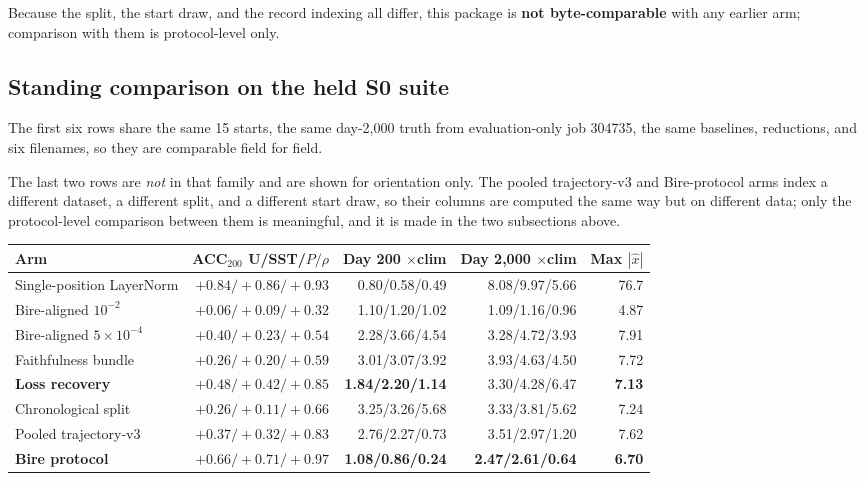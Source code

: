 \documentclass[11pt]{article}
\begin{document}
Because the split, the start draw, and the record indexing all differ, this
package is \textbf{not byte-comparable} with any earlier arm; comparison with
them is protocol-level only.

\subsection{Standing comparison on the held S0 suite}

The first six rows share the same 15 starts, the same day-2,000 truth from
evaluation-only job 304735, the same baselines, reductions, and six filenames, so they
are comparable field for field.

The last two rows are \emph{not} in that family and are shown for orientation only.
The pooled trajectory-v3 and Bire-protocol arms index a different dataset, a different
split, and a different start draw, so their columns are computed the same way but on
different data; only the protocol-level comparison between them is meaningful, and it
is made in the two subsections above.

\begin{center}\small
\begin{tabular}{@{}lrrrr@{}}
\toprule
\textbf{Arm} & \textbf{ACC\(_{200}\) U/SST/\(P/\rho\)} &
\textbf{Day 200 \(\times\)clim} & \textbf{Day 2,000 \(\times\)clim} &
\textbf{Max \(|\widehat{x}|\)} \\
\midrule
Single-position LayerNorm & \(+0.84/+0.86/+0.93\) & 0.80/0.58/0.49 &
8.08/9.97/5.66 & 76.7 \\
Bire-aligned \(10^{-2}\) & \(+0.06/+0.09/+0.32\) & 1.10/1.20/1.02 &
1.09/1.16/0.96 & 4.87 \\
Bire-aligned \(5\times10^{-4}\) & \(+0.40/+0.23/+0.54\) & 2.28/3.66/4.54 &
3.28/4.72/3.93 & 7.91 \\
Faithfulness bundle & \(+0.26/+0.20/+0.59\) & 3.01/3.07/3.92 &
3.93/4.63/4.50 & 7.72 \\
\textbf{Loss recovery} & \(\mathbf{+0.48/+0.42/+0.85}\) &
\textbf{1.84/2.20/1.14} & 3.30/4.28/6.47 & \textbf{7.13} \\
Chronological split & \(+0.26/+0.11/+0.66\) & 3.25/3.26/5.68 &
3.33/3.81/5.62 & 7.24 \\
Pooled trajectory-v3 & \(+0.37/+0.32/+0.83\) & 2.76/2.27/0.73 &
3.51/2.97/1.20 & 7.62 \\
\textbf{Bire protocol} & \(\mathbf{+0.66/+0.71/+0.97}\) &
\textbf{1.08/0.86/0.24} & \textbf{2.47/2.61/0.64} & \textbf{6.70} \\
\bottomrule
\end{tabular}
\end{center}
\end{document}
